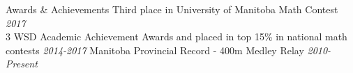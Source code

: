 \documentclass{resume} %
\newcommand{\award}[2]{#1 \hfill {\em #2}}
\begin{document}

\begin{rSection}{Awards \& Achievements}
    \award{Third place in University of Manitoba Math Contest}{2017} \\
    \award{3 WSD Academic Achievement Awards and placed in top 15\% in national math contests}{2014-2017}
    \award{Manitoba Provincial Record - 400m Medley Relay } {2010-Present}
\end{rSection}


    
    
\end{document}

